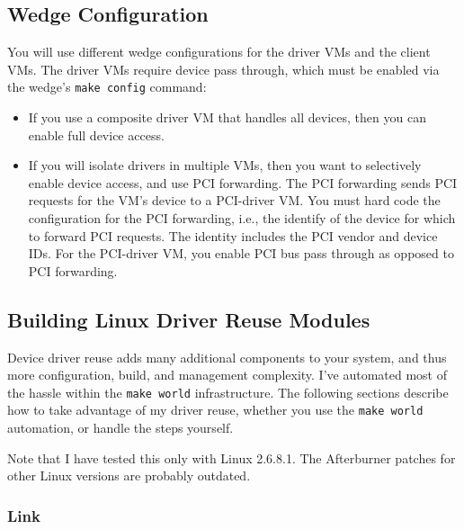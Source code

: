\documentclass[10pt,a4paper]{article}
\newcommand{\cmd}[1]{\texttt{#1}}
\begin{document}
\subsection{Wedge Configuration}

You will use different wedge configurations for the driver VMs and the
client VMs.  The driver VMs require device pass through, which must be
enabled via the wedge's \cmd{make config} command:  \begin{itemize}
\item If you use a composite driver VM that handles all devices, then 
you can enable full device access.
\item If you will isolate drivers in multiple VMs, then
you want to selectively enable device access, and use PCI forwarding.
The PCI forwarding sends PCI requests for the VM's device to a
PCI-driver VM.  You must hard code the configuration for the PCI
forwarding, i.e., the identify of the device for which to forward PCI
requests.  The identity includes the PCI vendor and device IDs.
For the PCI-driver VM, you enable PCI bus pass through as opposed to
PCI forwarding.
\end{itemize}


\subsection{Building Linux Driver Reuse Modules}

Device driver reuse adds many additional components to your system,
and thus more configuration, build, and management complexity.  I've
automated most of the hassle within the \cmd{make world}
infrastructure.  The following sections describe how to take advantage
of my driver reuse, whether you use the \cmd{make world} automation,
or handle the steps yourself.

Note that I have tested this only with Linux 2.6.8.1.  The Afterburner
patches for other Linux versions are probably outdated.

\subsubsection{Link}
\end{document}
